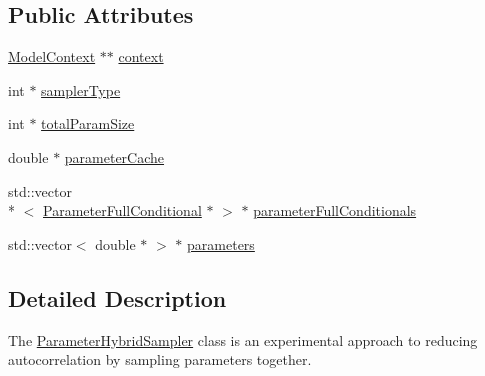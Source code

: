 \subsection*{Public Attributes}
\begin{DoxyCompactItemize}
\item 
\hyperlink{classSpatialSEIR_1_1ModelContext}{Model\-Context} $\ast$$\ast$ \hyperlink{classSpatialSEIR_1_1ParameterHybridSampler_ad0bac901a073df234be795c3c989240b}{context}
\item 
int $\ast$ \hyperlink{classSpatialSEIR_1_1ParameterHybridSampler_a09803b093b9f8864fc8923d41c25c5d5}{sampler\-Type}
\item 
int $\ast$ \hyperlink{classSpatialSEIR_1_1ParameterHybridSampler_a0b875aabb2a3ea61945bc5354bfd151f}{total\-Param\-Size}
\item 
double $\ast$ \hyperlink{classSpatialSEIR_1_1ParameterHybridSampler_af6d11e07102ea7785b13252e2a9d2028}{parameter\-Cache}
\item 
std\-::vector\\*
$<$ \hyperlink{classSpatialSEIR_1_1ParameterFullConditional}{Parameter\-Full\-Conditional} $\ast$ $>$ $\ast$ \hyperlink{classSpatialSEIR_1_1ParameterHybridSampler_ae9ee223f22eaa7bc7c1a1ac0a046bbb5}{parameter\-Full\-Conditionals}
\item 
std\-::vector$<$ double $\ast$ $>$ $\ast$ \hyperlink{classSpatialSEIR_1_1ParameterHybridSampler_a78b4981910745b46803a7257e6cdc348}{parameters}
\end{DoxyCompactItemize}


\subsection{Detailed Description}
The \hyperlink{classSpatialSEIR_1_1ParameterHybridSampler}{Parameter\-Hybrid\-Sampler} class is an experimental approach to reducing autocorrelation by sampling parameters together. 

